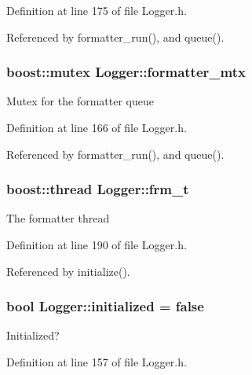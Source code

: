 Definition at line 175 of file Logger.h.



Referenced by formatter\_\-run(), and queue().

\hypertarget{classLogger_a5114b8ee8bc6f37b217aa8c36d5a342d}{
\subsubsection[{formatter\_\-mtx}]{\setlength{\rightskip}{0pt plus 5cm}boost::mutex {\bf Logger::formatter\_\-mtx}}}
\label{classLogger_a5114b8ee8bc6f37b217aa8c36d5a342d}
Mutex for the formatter queue 

Definition at line 166 of file Logger.h.



Referenced by formatter\_\-run(), and queue().

\hypertarget{classLogger_a46e8969c902a456bee9802196044f582}{
\subsubsection[{frm\_\-t}]{\setlength{\rightskip}{0pt plus 5cm}boost::thread {\bf Logger::frm\_\-t}}}
\label{classLogger_a46e8969c902a456bee9802196044f582}
The formatter thread 

Definition at line 190 of file Logger.h.



Referenced by initialize().

\hypertarget{classLogger_aef732b653322fdd9ba7b0a72e90814a4}{
\subsubsection[{initialized}]{\setlength{\rightskip}{0pt plus 5cm}bool {\bf Logger::initialized} = false}}
\label{classLogger_aef732b653322fdd9ba7b0a72e90814a4}
Initialized? 

Definition at line 157 of file Logger.h.



